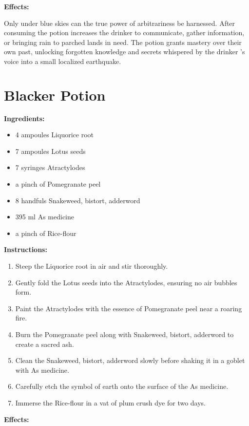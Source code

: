\documentclass{article}
\begin{document}
\textbf{Effects:}

Only under blue skies can the true power of arbitrariness be harnessed. After consuming the potion increases the drinker to communicate, gather information, or bringing rain to parched lands in need. The potion grants mastery over their own past, unlocking forgotten knowledge and secrets whispered by the drinker 's voice into a small localized earthquake.

\newpage
\section*{Blacker Potion}

\textbf{Ingredients:}

\begin{itemize}
  \item 4 ampoules Liquorice root
  \item 7 ampoules Lotus seeds
  \item 7 syringes Atractylodes
  \item a pinch of Pomegranate peel
  \item 8 handfuls Snakeweed, bistort, adderword
  \item 395 ml As medicine
  \item a pinch of Rice-flour
\end{itemize}

\textbf{Instructions:}

\begin{enumerate}
  \item Steep the Liquorice root in air and stir thoroughly.
  \item Gently fold the Lotus seeds into the Atractylodes, ensuring no air bubbles form.
  \item Paint the Atractylodes with the essence of Pomegranate peel near a roaring fire.
  \item Burn the Pomegranate peel along with Snakeweed, bistort, adderword to create a sacred ash.
  \item Clean the Snakeweed, bistort, adderword slowly before shaking it in a goblet with As medicine.
  \item Carefully etch the symbol of earth onto the surface of the As medicine.
  \item Immerse the Rice-flour in a vat of plum crush dye for two days.
\end{enumerate}

\textbf{Effects:}
\end{document}
